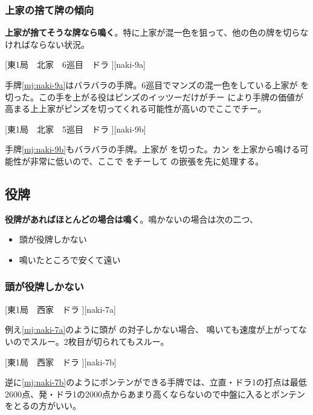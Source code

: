 \documentclass[10pt, twocolumn]{article}
\begin{document}
\subsubsection*{上家の捨て牌の傾向} 

\textbf{上家が捨てそうな牌なら鳴く}\citep[][p.~158]{hirasawa-naki}。特に上家が混一色を狙って、他の色の牌を切らなければならない状況。

[東1局　北家　6巡目　ドラ ][naki-9a]

手牌\ref{mj:naki-9a}はバラバラの手牌。6巡目でマンズの混一色をしている上家が  を切った。この手を上がる役はピンズのイッツーだけがチー  により手牌の価値が高まる上上家がピンズを切ってくれる可能性が高いのでここでチー。

[東1局　北家　5巡目　ドラ ][naki-9b]

手牌\ref{mj:naki-9b}もバラバラの手牌。上家が  を切った。カン  を上家から鳴ける可能性が非常に低いので、ここで  をチーして  の嵌張を先に処理する。

\subsection{役牌}

\textbf{役牌があればほとんどの場合は鳴く}。鳴かないの場合は次の二つ\citep[][p.~103]{hirasawa-naki}、

\begin{itemize}
\item 頭が役牌しかない
\item 鳴いたところで安くて遠い
\end{itemize}

\subsubsection*{頭が役牌しかない} 

[東1局　西家　ドラ ][naki-7a]

例え\ref{mj:naki-7a}のように頭が  の対子しかない場合、 鳴いても速度が上がってないのでスルー。2枚目が切られてもスルー\citep[][p.~104]{hirasawa-naki}。

[東1局　西家　ドラ ][naki-7b]

逆に\ref{mj:naki-7b}のようにポンテンができる手牌では、立直・ドラ1の打点は最低2600点、発・ドラ1の2000点からあまり高くならないので中盤に入るとポンテンをとるの方がいい\citep[][pp.~105--106]{hirasawa-naki}。
\end{document}

